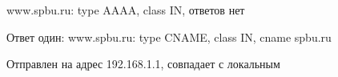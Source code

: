 \documentclass[a4paper,11pt]{article}
\begin{document}
www.spbu.ru: type AAAA, class IN, ответов нет 

\begin{center}
\label{fig:image}
\end{center}

Ответ один: www.spbu.ru: type CNAME, class IN, cname spbu.ru

\begin{center}
\label{fig:image}
\end{center}
Отправлен на адрес 192.168.1.1, совпадает с локальным 
\end{document}
